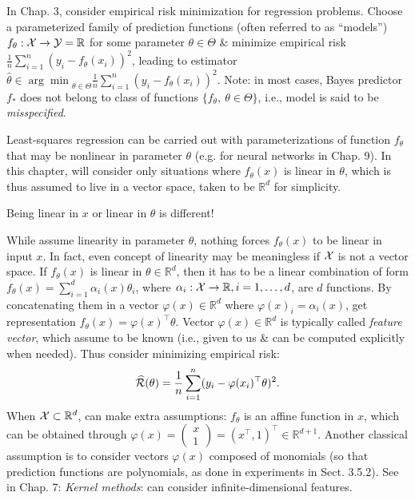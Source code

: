 \documentclass{article}
\begin{document}
\begin{enumerate}
\begin{itemize}
\begin{itemize}
			In Chap. 3, consider empirical risk minimization for regression problems. Choose a parameterized family of prediction functions (often referred to as ``models'') $f_\theta:{\cal X}\to{\cal Y} = \mathbb{R}$ for some parameter $\theta\in\Theta$ \& minimize empirical risk $\frac{1}{n}\sum_{i=1}^n (y_i - f_\theta(x_i))^2$, leading to estimator $\hat{\theta}\in{\arg\min}_{\theta\in\Theta} \frac{1}{n}\sum_{i=1}^n (y_i - f_\theta(x_i))^2$. Note: in most cases, Bayes predictor $f_*$ does not belong to class of functions $\{f_\theta,\ \theta\in\Theta\}$, i.e., model is said to be {\it misspecified}.
			
			Least-squares regression can be carried out with parameterizations of function $f_\theta$ that may be nonlinear in parameter $\theta$ (e.g. for neural networks in Chap. 9). In this chapter, will consider only situations where $f_\theta(x)$ is linear in $\theta$, which is thus assumed to live in a vector space, taken to be $\mathbb{R}^d$ for simplicity.
			
			Being linear in $x$ or linear in $\theta$ is different!
			
			While assume linearity in parameter $\theta$, nothing forces $f_\theta(x)$ to be linear in input $x$. In fact, even concept of linearity may be meaningless if ${\cal X}$ is not a vector space. If $f_\theta(x)$ is linear in $\theta\in\mathbb{R}^d$, then it has to be a linear combination of form $f_\theta(x) = \sum_{i=1}^d \alpha_i(x)\theta_i$, where $\alpha_i:{\cal X}\to\mathbb{R},i = 1,\ldots,d$, are $d$ functions. By concatenating them in a vector $\varphi(x)\in\mathbb{R}^d$ where $\varphi(x)_i = \alpha_i(x)$, get representation $f_\theta(x) = \varphi(x)^\top\theta$. Vector $\varphi(x)\in\mathbb{R}^d$ is typically called {\it feature vector}, which assume to be known (i.e., given to us \& can be computed explicitly when needed). Thus consider minimizing empirical risk:
			\begin{equation}
				\label{empirical risk}
				\widehat{\cal R}(\theta) = \frac{1}{n}\sum_{i=1}^n (y_i - \varphi(x_i)^\top\theta)^2.
			\end{equation}
			When ${\cal X}\subset\mathbb{R}^d$, can make extra assumptions: $f_\theta$ is an affine function in $x$, which can be obtained through $\varphi(x) = \begin{pmatrix}
				x\\1
			\end{pmatrix} = (x^\top,1)^\top\in\mathbb{R}^{d+1}$. Another classical assumption is to consider vectors $\varphi(x)$ composed of monomials (so that prediction functions are polynomials, as done in experiments in Sect. 3.5.2). See in Chap. 7: {\it Kernel methods}: can consider infinite-dimensional features.
			

\end{itemize}
\end{itemize}
\end{enumerate}
\end{document}
